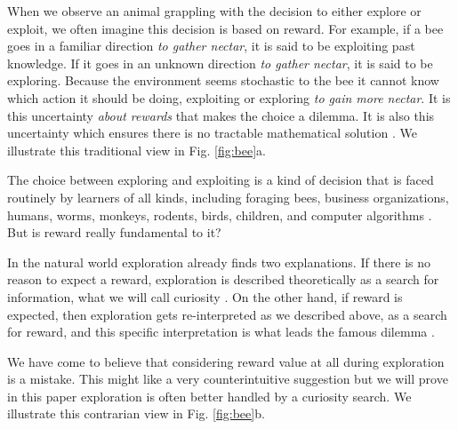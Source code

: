 When we observe an animal grappling with the decision to either explore or exploit, we often imagine this decision is based on reward. For example, if a bee goes in a familiar direction \textit{to gather nectar}, it is said to be exploiting past knowledge. If it goes in an unknown direction \textit{to gather nectar}, it is said to be exploring. Because the environment seems stochastic to the bee it cannot know which action it should be doing, exploiting or exploring \textit{to gain more nectar}. It is this uncertainty \textit{about rewards} that makes the choice a dilemma. It is also this uncertainty which ensures there is no tractable mathematical solution \citep{Thrun1992a,Dayan1996,Ishii2002,Simsek2006,Gershman2018b}. We illustrate this traditional view in Fig. \ref{fig:bee}a.

The choice between exploring and exploiting is a kind of decision that is faced routinely by learners of all kinds, including foraging bees, business organizations, humans, worms, monkeys, rodents, birds, children, and computer algorithms \citep{Gupta2006,Sutton2018,Woodgate2017,Lee2011a,Schulz2018a,Calhoun2014,Wang2019,Sumner2019,Auersperg2015}. But is reward really fundamental to it?

In the natural world exploration already finds two explanations. If there is no reason to expect a reward, exploration is described theoretically as a search for information, what we will call curiosity \citep{Berlyne1950,Schmidhuber1991,Kidd2015,deAbril2018,Jaegle2019,Friston2016}. On the other hand, if reward is expected, then exploration gets re-interpreted as we described above, as a search for reward, and this specific interpretation is what leads the famous dilemma \citep{Kelly1956,Berger-Tal2014,Dayan1996,Thrun1992,Mehlhorn2015,Kobayashi2019}. 

We have come to believe that considering reward value at all during exploration is a mistake. This might like a very counterintuitive suggestion but we will prove in this paper exploration is often better handled by a curiosity search. We illustrate this contrarian view in Fig. \ref{fig:bee}b.

